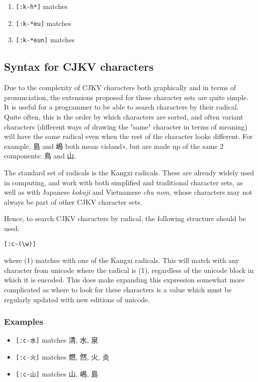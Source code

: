 \documentclass{article}
\begin{document}
\begin{enumerate}
  \item \texttt{[:k-h*]} matches
  \item \texttt{[:k-*{eu}]} matches
  \item \texttt{[:k-*{eu}n]} matches
\end{enumerate}

\subsection{Syntax for CJKV characters}

Due to the complexity of CJKV characters both graphically and in terms of
pronunciation, the extensions proposed for these character sets are quite
simple. It is useful for a programmer to be able to search characters by their
radical. Quite often, this is the order by which characters are sorted, and
often variant characters (different ways of drawing the "same" character in
terms of meaning) will have the same radical even when the rest of the character
looks different. For example, 島 and 嶋 both mean «island», but are made up of
the same 2 components: 鳥 and 山.

The standard set of radicals is the Kangxi radicals. These are already widely
used in computing, and work with both simplified and traditional character sets,
as well as with Japanese \textit{kokuji} and Vietnamese \textit{chu nom}, whose
characters may not always be part of other CJKV character sets.

Hence, to search CJKV characters by radical, the following structure should be
used:

\texttt{[:c-(\textbackslash w)]}

where (1) matches with one of the Kangxi radicals. This will match with any
character from unicode where the radical is (1), regardless of the unicode block
in which it is encoded. This does make expanding this expression somewhat more
complicated as where to look for these characters is a value which must be
regularly updated with new editions of unicode.

\subsubsection{Examples}

\begin{itemize}
  \item \texttt{[:c-水]} matches 清, 水, 泉
  \item \texttt{[:c-火]} matches 燃, 然, 火, 炎
  \item \texttt{[:c-山]} matches 山, 嶋, 島
\end{itemize}
\end{document}
